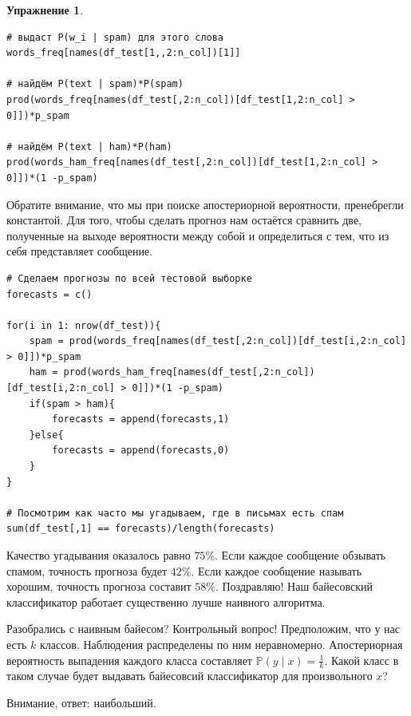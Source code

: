 \documentclass[12pt, a4paper, oneside]{extreport}
\def \mbb{\mathbb}
\def \PP{\mbb{P}}
\theoremstyle{plain}              %
\theoremstyle{definition}         %
\newtheorem{problem}{\color{myblue} Упражнение}
\begin{document}
\begin{problem}
\begin{sol}
\begin{verbatim}
# выдаст P(w_i | spam) для этого слова 
words_freq[names(df_test[1,,2:n_col])[1]]  

# найдём P(text | spam)*P(spam)
prod(words_freq[names(df_test[,2:n_col])[df_test[1,2:n_col] > 0]])*p_spam

# найдём P(text | ham)*P(ham)
prod(words_ham_freq[names(df_test[,2:n_col])[df_test[1,2:n_col] > 0]])*(1 -p_spam)
\end{verbatim}

Обратите внимание, что мы при поиске апостериорной вероятности, пренебрегли константой.  Для того, чтобы сделать прогноз нам остаётся сравнить две, полученные на выходе вероятности между собой и определиться с тем, что из себя представляет сообщение. 

\begin{verbatim}
# Сделаем прогнозы по всей тестовой выборке
forecasts = c()

for(i in 1: nrow(df_test)){
    spam = prod(words_freq[names(df_test[,2:n_col])[df_test[i,2:n_col] > 0]])*p_spam
    ham = prod(words_ham_freq[names(df_test[,2:n_col])[df_test[i,2:n_col] > 0]])*(1 -p_spam)
    if(spam > ham){
        forecasts = append(forecasts,1)
    }else{
        forecasts = append(forecasts,0)
    }
}

# Посмотрим как часто мы угадываем, где в письмах есть спам
sum(df_test[,1] == forecasts)/length(forecasts)
\end{verbatim}

Качество угадывания оказалось равно $75\%$. Если каждое сообщение обзывать спамом, точность прогноза будет $42\%$. Если каждое сообщение называть хорошим, точность прогноза составит $58\%$. Поздравляю! Наш байесовский классификатор работает существенно лучше наивного алгоритма. 

Разобрались с наивным байесом? Контрольный вопрос! Предположим, что у нас есть $k$ классов. Наблюдения распределены по ним неравномерно.  Апостериорная вероятность выпадения каждого класса составляет $\PP(y \mid x) = \frac{1}{k}$.  Какой класс в таком случае будет выдавать байесовсий классификатор для произвольного $x$? 

Внимание, ответ: наибольший. 
\end{sol} 
\end{problem} 
\end{document}
